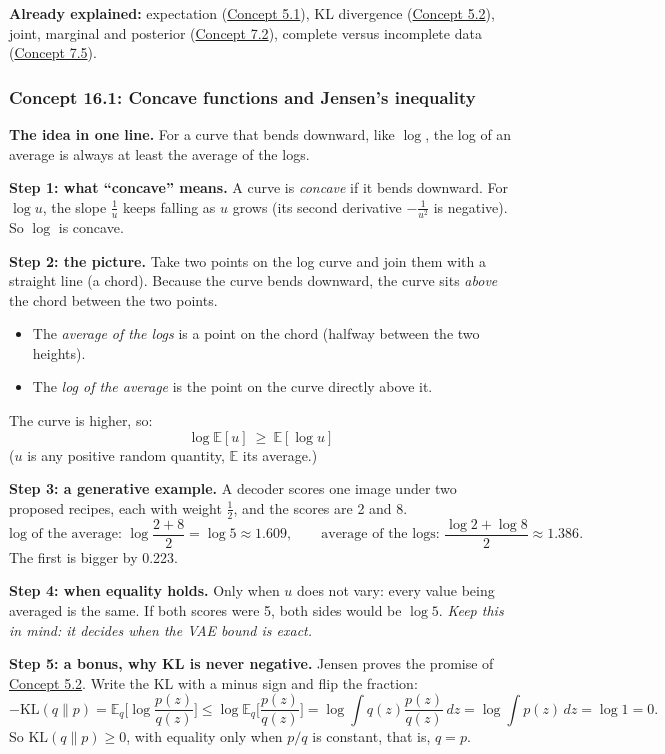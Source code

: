 \documentclass[12pt,a4paper]{article}
\begin{document}
\textbf{Already explained:} expectation (\hyperref[c5-1]{Concept 5.1}), KL divergence (\hyperref[c5-2]{Concept 5.2}), joint, marginal and posterior (\hyperref[c7-2]{Concept 7.2}), complete versus incomplete data (\hyperref[c7-5]{Concept 7.5}).

\subsubsection{Concept 16.1: Concave functions and Jensen's inequality}\label{c16-1}

\textbf{The idea in one line.} For a curve that bends downward, like $\log$, the log of an average is always at least the average of the logs.

\textbf{Step 1: what ``concave'' means.} A curve is \emph{concave} if it bends downward. For $\log u$, the slope $\frac1u$ keeps falling as $u$ grows (its second derivative $-\frac{1}{u^2}$ is negative). So $\log$ is concave.

\textbf{Step 2: the picture.} Take two points on the log curve and join them with a straight line (a chord). Because the curve bends downward, the curve sits \emph{above} the chord between the two points.
\begin{itemize}[nosep]
  \item The \emph{average of the logs} is a point on the chord (halfway between the two heights).
  \item The \emph{log of the average} is the point on the curve directly above it.
\end{itemize}
The curve is higher, so:
\[
\log\mathbb{E}[u]\ \ge\ \mathbb{E}[\log u]
\]
($u$ is any positive random quantity, $\mathbb{E}$ its average.)

\textbf{Step 3: a generative example.} A decoder scores one image under two proposed recipes, each with weight $\frac12$, and the scores are 2 and 8.
\[
\text{log of the average: }\log\frac{2+8}{2}=\log5\approx1.609,\qquad \text{average of the logs: }\frac{\log2+\log8}{2}\approx1.386 .
\]
The first is bigger by 0.223.

\textbf{Step 4: when equality holds.} Only when $u$ does not vary: every value being averaged is the same. If both scores were 5, both sides would be $\log5$. \emph{Keep this in mind: it decides when the VAE bound is exact.}

\textbf{Step 5: a bonus, why KL is never negative.} Jensen proves the promise of \hyperref[c5-2]{Concept 5.2}. Write the KL with a minus sign and flip the fraction:
\[
-\mathrm{KL}(q\|p)=\mathbb{E}_q\!\Big[\log\frac{p(z)}{q(z)}\Big]\le\log\mathbb{E}_q\!\Big[\frac{p(z)}{q(z)}\Big]=\log\int q(z)\frac{p(z)}{q(z)}\,dz=\log\int p(z)\,dz=\log1=0 .
\]
So $\mathrm{KL}(q\|p)\ge0$, with equality only when $p/q$ is constant, that is, $q=p$.
\end{document}
